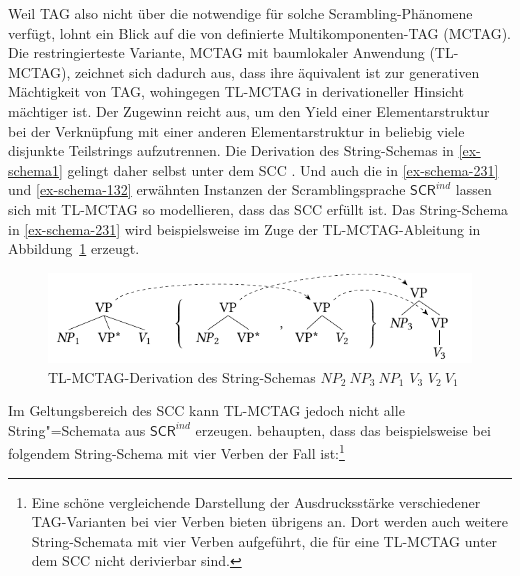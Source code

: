 Weil TAG also nicht über die notwendige  für solche Scrambling-Phänomene verfügt, lohnt ein Blick auf die von \cite{Weir:88} definierte Multikomponenten-TAG (MCTAG). Die restringierteste Variante, MCTAG mit baumlokaler Anwendung (TL-MCTAG), zeichnet sich dadurch aus, dass ihre  äquivalent ist zur generativen Mächtigkeit von TAG, wohingegen TL-MCTAG in derivationeller Hinsicht mächtiger ist. Der Zugewinn reicht aus, um den Yield einer Elementarstruktur bei der Verknüpfung mit einer anderen Elementarstruktur in beliebig viele disjunkte Teilstrings aufzutrennen. Die Derivation des String-Schemas in \ref{ex-schema1} gelingt daher selbst unter dem SCC \citep[Abbildung~6]{Joshi:Becker:Rambow:00}. Und auch die in \ref{ex-schema-231} und \ref{ex-schema-132} erwähnten Instanzen der Scramblingsprache $\mathsf{SCR}^{ind}$ lassen sich mit TL-MCTAG so modellieren, dass das SCC erfüllt ist. Das String-Schema in \ref{ex-schema-231} wird beispielsweise im Zuge der TL-MCTAG-Ableitung in Abbildung~\ref{fig-schema-231} erzeugt. 
\begin{figure}[t]
\centering
\includegraphics{graphics/abb515.pdf}
\caption{\label{fig-schema-231}TL-MCTAG-Derivation des String-Schemas $\mathit{NP}_2 ~ \mathit{NP}_3 ~ \mathit{NP}_1 $ $V_3$ $V_2 ~ V_1$}
\end{figure}

Im Geltungsbereich des SCC kann TL-MCTAG jedoch nicht alle String"=Schemata aus $\mathsf{SCR}^{ind}$ erzeugen. \citet[175]{Joshi:Becker:Rambow:00} behaupten, dass das beispielsweise bei folgendem String-Schema mit vier Verben der Fall ist:\footnote{Eine schöne vergleichende Darstellung der Ausdrucksstärke verschiedener TAG-Varianten bei vier Verben bieten übrigens \citet[Fig.\,3,Fig.\,7]{Chen-Main:Joshi:08} an. Dort werden auch weitere String-Schemata mit vier Verben aufgeführt, die für eine TL-MCTAG unter dem SCC nicht derivierbar sind.}

